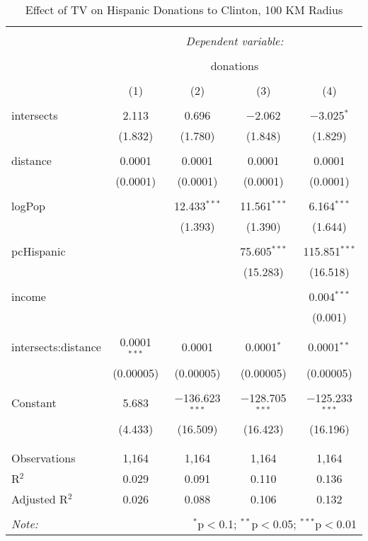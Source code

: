 
\begin{table}[!htbp] \centering 
  \caption{Effect of TV on Hispanic Donations to Clinton, 100 KM Radius} 
  \label{} 
\begin{tabular}{@{\extracolsep{-5pt}}lcccc} 
\\[-1.8ex]\hline 
\hline \\[-1.8ex] 
 & \multicolumn{4}{c}{\textit{Dependent variable:}} \\ 
\cline{2-5} 
\\[-1.8ex] & \multicolumn{4}{c}{donations} \\ 
\\[-1.8ex] & (1) & (2) & (3) & (4)\\ 
\hline \\[-1.8ex] 
 intersects & 2.113 & 0.696 & $-$2.062 & $-$3.025$^{*}$ \\ 
  & (1.832) & (1.780) & (1.848) & (1.829) \\ 
  & & & & \\ 
 distance & 0.0001 & 0.0001 & 0.0001 & 0.0001 \\ 
  & (0.0001) & (0.0001) & (0.0001) & (0.0001) \\ 
  & & & & \\ 
 logPop &  & 12.433$^{***}$ & 11.561$^{***}$ & 6.164$^{***}$ \\ 
  &  & (1.393) & (1.390) & (1.644) \\ 
  & & & & \\ 
 pcHispanic &  &  & 75.605$^{***}$ & 115.851$^{***}$ \\ 
  &  &  & (15.283) & (16.518) \\ 
  & & & & \\ 
 income &  &  &  & 0.004$^{***}$ \\ 
  &  &  &  & (0.001) \\ 
  & & & & \\ 
 intersects:distance & 0.0001$^{***}$ & 0.0001 & 0.0001$^{*}$ & 0.0001$^{**}$ \\ 
  & (0.00005) & (0.00005) & (0.00005) & (0.00005) \\ 
  & & & & \\ 
 Constant & 5.683 & $-$136.623$^{***}$ & $-$128.705$^{***}$ & $-$125.233$^{***}$ \\ 
  & (4.433) & (16.509) & (16.423) & (16.196) \\ 
  & & & & \\ 
\hline \\[-1.8ex] 
Observations & 1,164 & 1,164 & 1,164 & 1,164 \\ 
R$^{2}$ & 0.029 & 0.091 & 0.110 & 0.136 \\ 
Adjusted R$^{2}$ & 0.026 & 0.088 & 0.106 & 0.132 \\ 
\hline 
\hline \\[-1.8ex] 
\textit{Note:}  & \multicolumn{4}{r}{$^{*}$p$<$0.1; $^{**}$p$<$0.05; $^{***}$p$<$0.01} \\ 
\end{tabular} 
\end{table} 
